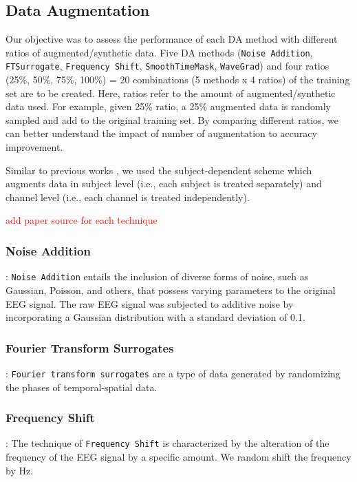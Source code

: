 \documentclass[runningheads]{llncs}
\begin{document}
\subsection{Data Augmentation}
Our objective was to assess the performance of each DA method with different ratios of augmented/synthetic data. Five DA methods (\texttt{Noise Addition}, \texttt{FTSurrogate}, \texttt{Frequency Shift}, \texttt{SmoothTimeMask}, \texttt{WaveGrad}) and four ratios (25\%, 50\%, 75\%, 100\%) = 20 combinations (5 methods x 4 ratios) of the training set are to be created.  Here, ratios refer to the amount of augmented/synthetic data used.  For example, given 25\% ratio, a 25\% augmented data is randomly sampled and add to the original training set.  By comparing different ratios, we can better understand the impact of number of augmentation to accuracy improvement.

\begin{sloppypar}
Similar to previous works \cite{rommel2021cadda,mohsenvand2020contrastive,leeb2008bci,terzano2001atlas}, we used the subject-dependent scheme which augments data in subject level (i.e., each subject is treated separately) and channel level (i.e., each channel is treated independently).
\end{sloppypar}

\textcolor{red}{add paper source for each technique}

\subsubsection{Noise Addition}: \texttt{Noise Addition} entails the inclusion of diverse forms of noise, such as Gaussian, Poisson, and others, that possess varying parameters to the original EEG signal. The raw EEG signal was subjected to additive noise by incorporating a Gaussian distribution with a standard deviation of 0.1. 

\subsubsection{Fourier Transform Surrogates}:
\texttt{Fourier transform surrogates} are a type of data generated by randomizing the phases of temporal-spatial data.


\subsubsection{Frequency Shift}: The technique of \texttt{Frequency Shift} is characterized by the alteration of the frequency of the EEG signal by a specific amount.
We random shift the frequency by  Hz.
\end{document}
